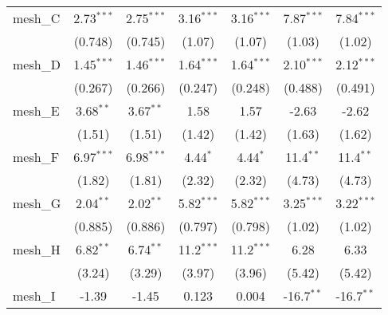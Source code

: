 \begin{tabular}{lcccccc}
   mesh\_C                                                     & 2.73$^{***}$  & 2.75$^{***}$  & 3.16$^{***}$  & 3.16$^{***}$   & 7.87$^{***}$  & 7.84$^{***}$\\   
                                                               & (0.748)       & (0.745)       & (1.07)        & (1.07)         & (1.03)        & (1.02)\\   
   mesh\_D                                                     & 1.45$^{***}$  & 1.46$^{***}$  & 1.64$^{***}$  & 1.64$^{***}$   & 2.10$^{***}$  & 2.12$^{***}$\\   
                                                               & (0.267)       & (0.266)       & (0.247)       & (0.248)        & (0.488)       & (0.491)\\   
   mesh\_E                                                     & 3.68$^{**}$   & 3.67$^{**}$   & 1.58          & 1.57           & -2.63         & -2.62\\   
                                                               & (1.51)        & (1.51)        & (1.42)        & (1.42)         & (1.63)        & (1.62)\\   
   mesh\_F                                                     & 6.97$^{***}$  & 6.98$^{***}$  & 4.44$^{*}$    & 4.44$^{*}$     & 11.4$^{**}$   & 11.4$^{**}$\\   
                                                               & (1.82)        & (1.81)        & (2.32)        & (2.32)         & (4.73)        & (4.73)\\   
   mesh\_G                                                     & 2.04$^{**}$   & 2.02$^{**}$   & 5.82$^{***}$  & 5.82$^{***}$   & 3.25$^{***}$  & 3.22$^{***}$\\   
                                                               & (0.885)       & (0.886)       & (0.797)       & (0.798)        & (1.02)        & (1.02)\\   
   mesh\_H                                                     & 6.82$^{**}$   & 6.74$^{**}$   & 11.2$^{***}$  & 11.2$^{***}$   & 6.28          & 6.33\\   
                                                               & (3.24)        & (3.29)        & (3.97)        & (3.96)         & (5.42)        & (5.42)\\   
   mesh\_I                                                     & -1.39         & -1.45         & 0.123         & 0.004          & -16.7$^{**}$  & -16.7$^{**}$\\   

\end{tabular}
